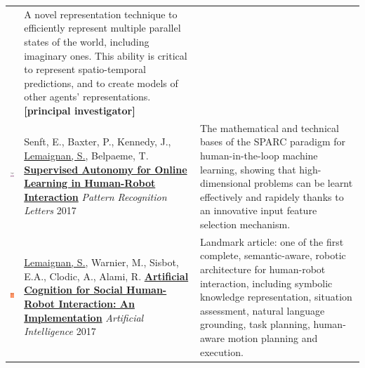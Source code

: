 \documentclass[11pt,a4paper]{report}
\begin{document}
\begin{tabular}{p{1.7cm}p{7cm}p{8cm}}
    & \small A novel representation technique to efficiently
    represent multiple parallel states of the world, including imaginary ones.
    This ability is critical to represent spatio-temporal predictions, and to
    create models of other agents' representations.
    \textbf{[principal investigator]}\\



    \vspace{-.20cm}\includegraphics[height=2.2cm]{thumbs/2017-sparc.jpg} &

    Senft, E., Baxter, P., Kennedy, J., \ul{Lemaignan, S.}, Belpaeme, T.
    \newline\href{https://doi.org/10.1016/j.patrec.2017.03.015}{\textbf{Supervised
    Autonomy for Online Learning in Human-Robot Interaction}}
    \newline \textit{Pattern Recognition Letters} 2017
    & \small The mathematical and technical bases of the SPARC
    paradigm for human-in-the-loop machine learning, showing that
    high-dimensional problems can be learnt effectively and rapidely thanks to
    an innovative input feature selection mechanism.
    \textbf{}\\


    \vspace{-.20cm}\includegraphics[height=2.2cm]{thumbs/2017-ai-cover.jpg} &

    \ul{Lemaignan, S.}, Warnier, M., Sisbot, E.A., Clodic, A., Alami, R.
    \newline
    \href{https://doi.org/10.1016/j.artint.2016.07.002}{\textbf{Artificial
    Cognition for Social Human-Robot Interaction: An Implementation}}
    \newline \textit{Artificial Intelligence} 2017
    & \small Landmark article: one of the first complete, semantic-aware, robotic architecture for
    human-robot interaction, including symbolic knowledge representation,
    situation assessment, natural language grounding, task planning, human-aware
    motion planning and execution. \textbf{}\\



\end{tabular}
\end{document}
